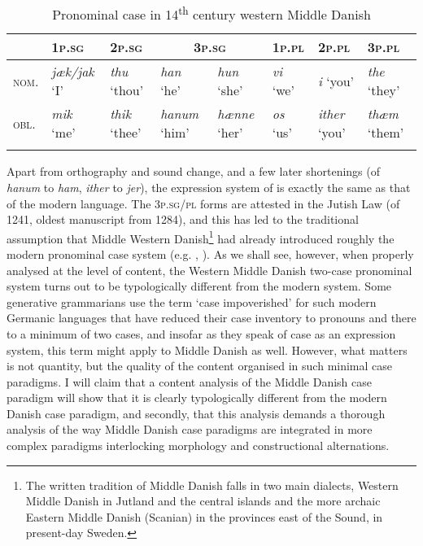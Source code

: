 \documentclass[output=paper]{langscibook}
\begin{document}
\begin{table}
\caption{Pronominal case in 14\textsuperscript{th} century western Middle Danish\label{tab:heltoft:1}}
\begin{tabularx}{\textwidth}{lXXXXXXX} 
\lsptoprule
& \textsc{1p.sg} & \textsc{2p.sg} & \multicolumn{2}{c}{\textsc{3p.sg}} & \textsc{1p.pl} & \textsc{2p.pl} & \textsc{3p.pl}\\\midrule
\textsc{nom}. & \textit{jæk/jak} ‘I' & \textit{thu} ‘thou' & \textit{han} ‘he' & \textit{hun} ‘she' & \textit{vi} ‘we' & \textit{i} ‘you' & \textit{the} ‘they'\\
\textsc{obl.} & \textit{mik} ‘me' & \textit{thik} ‘thee' & \textit{hanum} ‘him' & \textit{hænne} ‘her' & \textit{os} ‘us' & \textit{ither} ‘you' & \textit{thæm} ‘them'\\
\lspbottomrule
\end{tabularx}
\end{table}

Apart from orthography and sound change, and a few later shortenings (of \textit{hanum} to \textit{ham}, \textit{ither} to \textit{jer}), the expression system of  is exactly the same as that of the modern language. The \textsc{3p.sg/pl} forms are attested in the Jutish Law (of 1241, oldest manuscript from 1284), and this has led to the traditional assumption that Middle Western Danish\footnote{The written tradition of Middle Danish falls in two main dialects, Western Middle Danish in Jutland and the central islands and the more archaic Eastern Middle Danish (Scanian) in the provinces east of the Sound, in present-day Sweden.} had already introduced roughly the modern pronominal case system (e.g. \citealt[129]{Karker1991}, \citealt[198]{Karker1993}). As we shall see, however, when properly analysed at the level of content, the Western Middle Danish two-case pronominal system turns out to be typologically different from the modern system. Some generative grammarians \citep{Sigurðsson2006, Sigurðsson2012, Sigurðsson2012b, Parrott2012} use the term ‘case impoverished' for such modern Germanic languages that have reduced their case inventory to pronouns and there to a minimum of two cases, and insofar as they speak of case as an expression system, this term might apply to Middle Danish as well. However, what matters is not quantity, but the quality of the content organised in such minimal case paradigms. I will claim that a content analysis of the Middle Danish case paradigm will show that it is clearly typologically different from the modern Danish case paradigm, and secondly, that this analysis demands a thorough analysis of the way Middle Danish case paradigms are integrated in more complex paradigms interlocking morphology and constructional alternations. 
\end{document}
